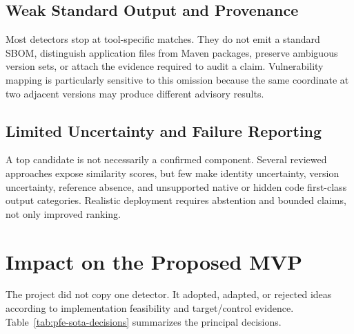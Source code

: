 \subsection{Weak Standard Output and Provenance}

Most detectors stop at tool-specific matches. They do not emit a standard
SBOM, distinguish application files from Maven packages, preserve ambiguous
version sets, or attach the evidence required to audit a claim. Vulnerability
mapping is particularly sensitive to this omission because the same
coordinate at two adjacent versions may produce different advisory results.

\subsection{Limited Uncertainty and Failure Reporting}

A top candidate is not necessarily a confirmed component. Several reviewed
approaches expose similarity scores, but few make identity uncertainty,
version uncertainty, reference absence, and unsupported native or hidden code
first-class output categories. Realistic deployment requires abstention and
bounded claims, not only improved ranking.

\section{Impact on the Proposed MVP}

The project did not copy one detector. It adopted, adapted, or rejected ideas
according to implementation feasibility and target/control evidence.
Table~\ref{tab:pfe-sota-decisions} summarizes the principal decisions.

